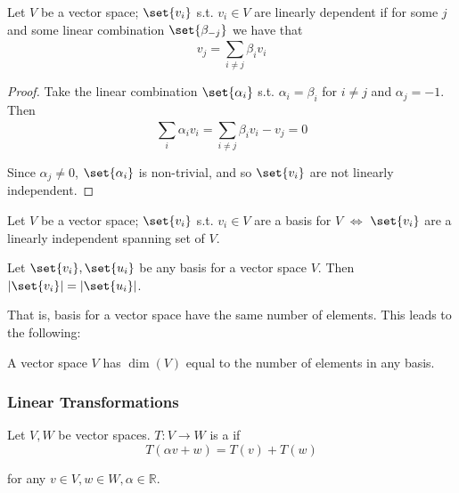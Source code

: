 \documentclass{article}
\begin{document}
\begin{theorem}
  Let $V$ be a vector space; $\set{v_i}$ s.t. $v_i \in V$ are linearly dependent if for some $j$ and some linear combination $\set{\beta_{-j}}$ we have that
  \[
    v_j = \sum^{}_{i \ne j} \beta_i v_i
  \]
\end{theorem}

\begin{proof}
  Take the linear combination $\set{\alpha_i}$ s.t. $\alpha_i = \beta_i$ for $i \ne j$ and $\alpha_j = -1$. Then
  \[
    \sum^{}_{i} \alpha_i v_i
    =
    \sum^{}_{i \ne j} \beta_i v_i - v_j
    =
    0
  \]

  Since $\alpha_j \ne 0$, $\set{\alpha_i}$ is non-trivial, and so $\set{v_i}$ are not linearly independent.
\end{proof}

\begin{theorem}
  Let $V$ be a vector space; $\set{v_i}$ s.t. $v_i \in V$ are a basis for $V$ $\iff$ $\set{v_i}$ are a linearly independent spanning set of $V$.
\end{theorem}

\begin{claim}
  Let $\set{v_i}, \set{u_i}$ be any basis for a vector space $V$. Then $|\set{v_i}| = |\set{u_i}|$.
\end{claim}

That is, basis for a vector space have the same number of elements. This leads to the following:
\begin{definition}
  A vector space $V$ has  $\dim(V)$ equal to the number of elements in any basis.
\end{definition}

\subsubsection{Linear Transformations}
\label{ssub:linear_transformations}

\begin{definition}
  Let $V, W$ be vector spaces. $T: V \to W$ is a  if
  \[
    T(\alpha v + w) = T(v) + T(w)
  \]

  for any $v \in V, w \in W, \alpha \in \mathbb{R}$.
\end{definition}
\end{document}
